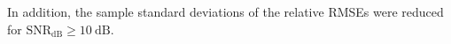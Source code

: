 %
%
%
In addition,
the sample standard deviations of
the relative \acp{RMSE} were reduced for
$\text{SNR}_{\text{dB}} \geq \SI{10}{\deci\bel}$.


